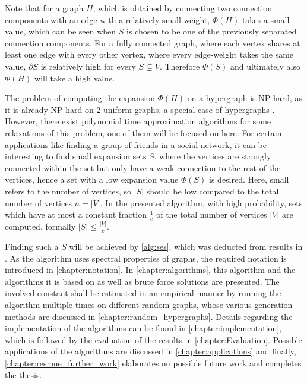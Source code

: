 Note that for a graph $H$, which is obtained by connecting two connection components with an edge with a relatively small weight, $\Phi(H)$ takes a small value, which can be seen when $S$ is chosen to be one of the previously separated connection components. For a fully connected graph, where each vertex shares at least one edge with every other vertex, where every edge-weight takes the same value,  $\partial S$ is relatively high for every $S\subsetneq V$. Therefore $\Phi(S)$ and ultimately also $\Phi(H)$ will take a high value.

The problem of computing the expansion $\Phi(H)$ on a hypergraph is NP-hard, as it is already NP-hard on 2-uniform-graphs, a special case of hypergraphs \cite{kaibel2004expansion}.
However, there exist polynomial time approximation algorithms for some relaxations of this problem, one of them will be focused on here:
For certain applications like finding a group of friends in a social network, it can be interesting to find small expansion sets $S$, where the vertices are strongly connected within the set but only have a weak connection to the rest of the vertices, hence a set with a low expansion value $\Phi(S)$ is desired. Here, small refers to the number of vertices, so $|S|$ should be low compared to the total number of vertices $n = |V|$. In the presented algorithm, with high probability, sets which have at most a constant fraction $\frac{1}{c}$ of the total number of vertices $|V|$ are computed, formally $|S|\le \frac{|V|}{c}$.

Finding such a $S$ will be achieved by \cref{alg:ses}, which was deducted from results in \cite{ChanLTZ16}. As the algorithm uses spectral properties of graphs, the required notation is introduced in \cref{chapter:notation}. In \cref{chapter:algorithms}, this algorithm and the algorithms it is based on as well as brute force solutions are presented.
The involved constant shall be estimated in an empirical manner by running the algorithm multiple times on different random graphs, whose various generation methods are discussed in \cref{chapter:random_hypergraphs}.  Details regarding the implementation of the algorithms can be found in \cref{chapter:implementation}, which is followed by the evaluation of the results in \cref{chapter:Evaluation}. Possible applications of the algorithms are discussed in \cref{chapter:applications} and finally, \cref{chapter:resmue_further_work} elaborates on possible future work and completes the thesis.








